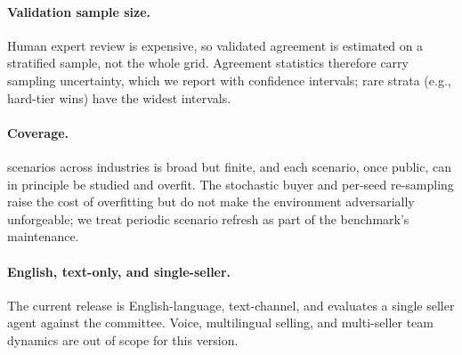 \paragraph{Validation sample size.} Human expert review is expensive, so
validated agreement is estimated on a stratified sample, not the whole grid.
Agreement statistics therefore carry sampling uncertainty, which we report with
confidence intervals; rare strata (e.g., hard-tier wins) have the widest
intervals.

\paragraph{Coverage.} \numScenarios{} scenarios across \numIndustries{} industries
is broad but finite, and each scenario, once public, can in principle be studied
and overfit. The stochastic buyer and per-seed re-sampling raise the cost of
overfitting but do not make the environment adversarially unforgeable; we treat
periodic scenario refresh as part of the benchmark's maintenance.

\paragraph{English, text-only, and single-seller.} The current release is
English-language, text-channel, and evaluates a single seller agent against the
committee. Voice, multilingual selling, and multi-seller team dynamics are out of
scope for this version.
